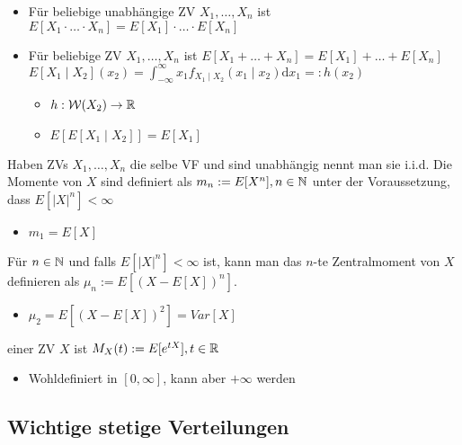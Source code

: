 \begin{itemize}
\begin{itemize}
            \item Für beliebige unabhängige ZV $X_1, \dots, X_n$ ist $E[X_1 \cdot \dots \cdot X_n] = E[X_1] \cdot \dots \cdot E[X_n]$
            \item Für beliebige ZV $X_1, \dots, X_n$ ist $E[X_1 + \dots + X_n] = E[X_1] + \dots + E[X_n]$
             $E[X_1 \mid X_2](x_2) = \int_{-\infty}^\infty x_1 f_{X_1 \mid X_2} (x_1 \mid x_2) \mathrm{d}x_1 =: h(x_2)$
            \begin{itemize}
                \item $h : \mathcal{W}(X_2) \to \mathbb{R}$
                \item $E[E[X_1 \mid X_2]] = E[X_1]$
            \end{itemize}
        \end{itemize}
     Haben ZVs $X_1, \dots, X_n$ die selbe VF und sind unabhängig nennt man sie i.i.d.
     Die Momente von $X$ sind definiert als $m_n := E[X^n], n \in \mathbb{N}$ unter der Voraussetzung, dass $E[|X|^n] < \infty$
        \begin{itemize}
            \item $m_1 = E[X]$
        \end{itemize}
     Für $n \in \mathbb{N}$ und falls $E[|X|^n] < \infty$ ist, kann man das $n$-te Zentralmoment von $X$ definieren als $\mu_n := E[(X - E[X])^n]$.
        \begin{itemize}
            \item $\mu_2 = E[(X - E[X])^2] = Var[X]$
        \end{itemize}
     einer ZV $X$ ist $M_X(t) := E[e^{tX}], t \in \mathbb{R}$
        \begin{itemize}
            \item Wohldefiniert in $[0, \infty]$, kann aber $+\infty$ werden
        \end{itemize}
\end{itemize}

\subsection{Wichtige stetige Verteilungen}
